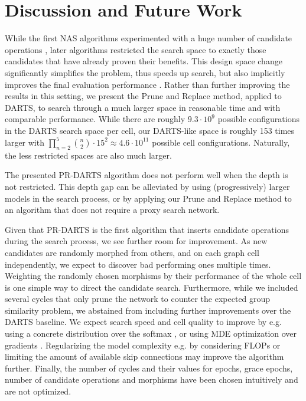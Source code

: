 \documentclass[conference]{IEEEtran}
\begin{document}



\section{Discussion and Future Work}
\label{s_discussion}

While the first NAS algorithms experimented with a huge number of candidate operations \cite{nas, nas_evo, nas_trans}, later algorithms \cite{nas_enas, nas_darts} restricted the search space to exactly those candidates that have already proven their benefits.
This design space change significantly simplifies the problem, thus speeds up search, but also implicitly improves the final evaluation performance \cite{etc_designspaces}.
Rather than further improving the results in this setting, we present the Prune and Replace method, applied to DARTS, to search through a much larger space in reasonable time and with comparable performance.
While there are roughly
$9.3 \cdot 10^{9}$
possible configurations in the DARTS search space per cell, our DARTS-like space is roughly 153 times larger with
$\prod_{n=2}^{5} {n \choose 2} \cdot 15^2 \approx 4.6 \cdot 10^{11}$ possible cell configurations. Naturally, the less restricted spaces are also much larger.

The presented PR-DARTS algorithm does not perform well when the depth is not restricted. This depth gap can be alleviated by using (progressively) larger models \cite{nas_pdarts} in the search process, or by applying our Prune and Replace method to an algorithm that does not require a proxy search network.

Given that PR-DARTS is the first algorithm that inserts candidate operations during the search process, we see further room for improvement.
As new candidates are randomly morphed from others, and on each graph cell independently, we expect to discover bad performing ones multiple times. Weighting the randomly chosen morphisms by their performance of the whole cell is one simple way to direct the candidate search. 
Furthermore, while we included several cycles that only prune the network to counter the expected group similarity problem, we abstained from including further improvements over the DARTS baseline.
We expect search speed and cell quality to improve by e.g. using a concrete distribution over the softmax \cite{nas_asap, nas_snas, etc_concrete}, or using MDE optimization over gradients \cite{nas_mde}.
Regularizing the model complexity e.g. by considering FLOPs or limiting the amount of available skip connections \cite{nas_pdarts} may improve the algorithm further. 
Finally, the number of cycles and their values for epochs, grace epochs, number of candidate operations and morphisms have been chosen intuitively and are not optimized.
\end{document}
